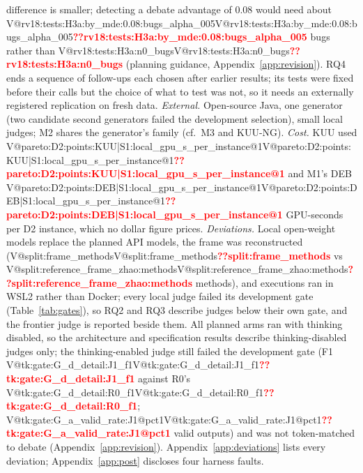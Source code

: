 \documentclass[pdflatex,iicol,sn-mathphys-num]{sn-jnl}
\makeatletter
\newcommand{\V}[1]{\ifcsname V@#1\endcsname\csname V@#1\endcsname\else\textbf{\textcolor{red}{??#1}}\fi}
\makeatother
\begin{document}
difference is smaller; detecting a debate advantage of 0.08 would need about \V{rv18:tests:H3a:by_mde:0.08:bugs_alpha_005} bugs rather than \V{rv18:tests:H3a:n0_bugs} (planning guidance, Appendix~\ref{app:revision}). RQ4 ends a sequence of follow-ups each chosen after earlier results; its tests were fixed before their calls but the choice of what to test was not, so it needs an externally registered replication on fresh data. \textit{External.} Open-source Java, one generator (two candidate second generators failed the development selection), small local judges; M2 shares the generator's family (cf.\ M3 and KUU-NG). \textit{Cost.} KUU used \V{pareto:D2:points:KUU|S1:local_gpu_s_per_instance@1} and M1's DEB \V{pareto:D2:points:DEB|S1:local_gpu_s_per_instance@1} GPU-seconds per D2 instance, which no dollar figure prices. \textit{Deviations.} Local open-weight models replace the planned API models, the frame was reconstructed (\V{split:frame_methods} vs \V{split:reference_frame_zhao:methods} methods), and executions ran in WSL2 rather than Docker; every local judge failed its development gate (Table~\ref{tab:gates}), so RQ2 and RQ3 describe judges below their own gate, and the frontier judge is reported beside them. All planned arms ran with thinking disabled, so the architecture and specification results describe thinking-disabled judges only; the thinking-enabled judge still failed the development gate (F1 \V{tk:gate:G_d_detail:J1_f1} against R0's \V{tk:gate:G_d_detail:R0_f1}; \V{tk:gate:G_a_valid_rate:J1@pct1} valid outputs) and was not token-matched to debate (Appendix~\ref{app:revision}). Appendix~\ref{app:deviations} lists every deviation; Appendix~\ref{app:post} discloses four harness faults.
\end{document}
